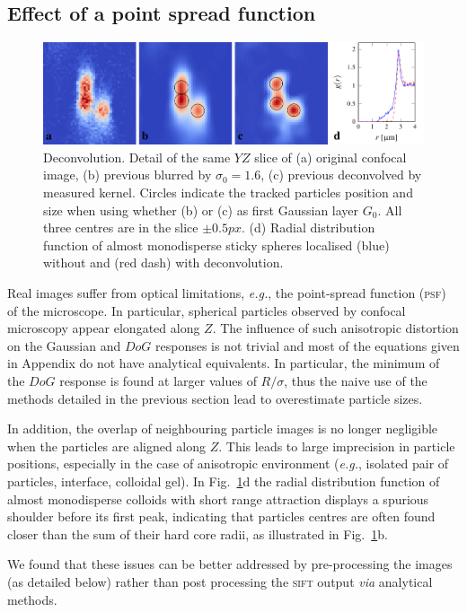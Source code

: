 \documentclass[8.5pt,twoside,twocolumn]{article}
\begin{document}
\subsection{Effect of a point spread function}
\begin{figure}
\centering
\includegraphics{fig_deconv.pdf}
	\caption{Deconvolution. Detail of the same $YZ$ slice of (a) original confocal image, (b) previous blurred by $\sigma_0=1.6$, (c) previous deconvolved by measured kernel. Circles indicate the tracked particles position and size when using whether (b) or (c) as first Gaussian layer $G_0$. All three centres are in the slice $\pm \unit{0.5}{px}$. (d) Radial distribution function of almost monodisperse sticky spheres localised (blue) without and (red dash) with deconvolution.}
	\label{fig:deconv}
\end{figure}

Real images suffer from optical limitations, \emph{e.g.}, the point-spread function (\textsc{psf}) of the microscope. In particular, spherical particles observed by confocal microscopy appear elongated along $Z$. The influence of such anisotropic distortion on the Gaussian and $DoG$ responses is not trivial and most of the equations given in Appendix do not have analytical equivalents. In particular, the minimum of the $DoG$ response is found at larger values of $R/\sigma$, thus the naive use of the methods detailed in the previous section lead to overestimate particle sizes.

In addition, the overlap of neighbouring particle images is no longer negligible when the particles are aligned along $Z$. This leads to large imprecision in particle positions, especially in the case of anisotropic environment (\emph{e.g.}, isolated pair of particles, interface, colloidal gel). In Fig.~\ref{fig:deconv}d the radial distribution function of almost monodisperse colloids with short range attraction displays a spurious shoulder before its first peak, indicating that particles centres are often found closer than the sum of their hard core radii, as illustrated in Fig.~\ref{fig:deconv}b.

We found that these issues can be better addressed by pre-processing the images (as detailed below) rather than post processing the \textsc{sift} output \emph{via} analytical methods.
\end{document}
